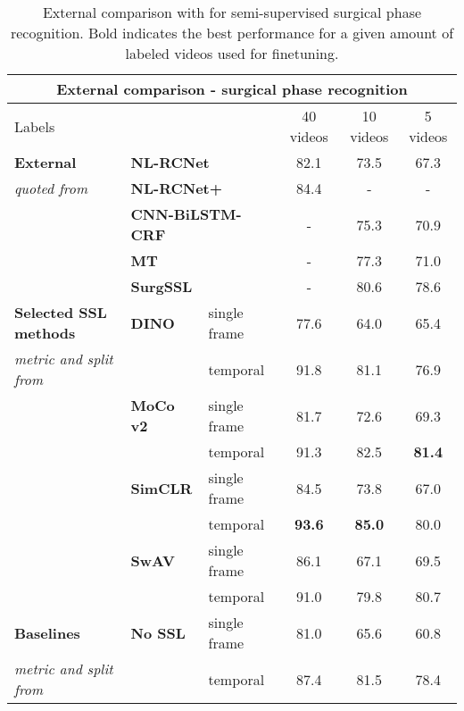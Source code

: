 \documentclass[times,twocolumn,final]{elsarticle}
\begin{document}
\begin{table*}[th!]
  \centering
  \caption{{\color{changetext}External comparison with \cite{shi_surgssl} for semi-supervised surgical phase recognition. Bold indicates the best performance for a given amount of labeled videos used for finetuning.}}
  \label{tab:cuhk}
  \begin{tabular*}{\textwidth}{l @{\extracolsep{\fill}}llccc}
  \hline
  \multicolumn{6}{c}{\textbf{External comparison - surgical phase recognition }}                   \\ \hline
  \multicolumn{3}{l}{Labels}                                                      & 40 videos & 10 videos  & 5 videos\\ \hline
  \textbf{External}         & \multicolumn{2}{l}{\textbf{NL-RCNet}}           & 82.1  & 73.5 & 67.3     \\
                  {\small \textit{quoted from \cite{shi_surgssl}}}              & \multicolumn{2}{l}{\textbf{NL-RCNet+}}          & 84.4  & -     & -  \\
                                & \multicolumn{2}{l}{\textbf{CNN-BiLSTM-CRF}}     & -     & 75.3  & 70.9  \\
                                & \multicolumn{2}{l}{\textbf{MT}}                 & -     & 77.3  & 71.0  \\
                                & \multicolumn{2}{l}{\textbf{SurgSSL}}            & -     & 80.6  & 78.6  \\ \hline
  \textbf{Selected SSL methods} & \textbf{DINO}                    & single frame & 77.6   & 64.0  & 65.4  \\
    {\small \textit{metric and split from \cite{shi_surgssl}}}&    & temporal     & 91.8   & 81.1  & 76.9  \\
                                & \textbf{MoCo v2}                 & single frame & 81.7   & 72.6  & 69.3  \\
                                &                                  & temporal     & 91.3   & 82.5  & \textbf{81.4}  \\
                                & \textbf{SimCLR}                  & single frame & 84.5   & 73.8  & 67.0  \\
                                &                                  & temporal     &\textbf{93.6}  & \textbf{85.0}  & 80.0  \\
                                & \textbf{SwAV}                    & single frame & 86.1   & 67.1  & 69.5  \\
                                &                                  & temporal     & 91.0   & 79.8  & 80.7  \\ \hline
  \textbf{Baselines}            & \textbf{No SSL}                  & single frame & 81.0   & 65.6  & 60.8  \\
            {\small \textit{metric and split from \cite{shi_surgssl}}}& & temporal&87.4   & 81.5  & 78.4  \\ \hline
  \end{tabular*}
\end{table*}
\end{document}
